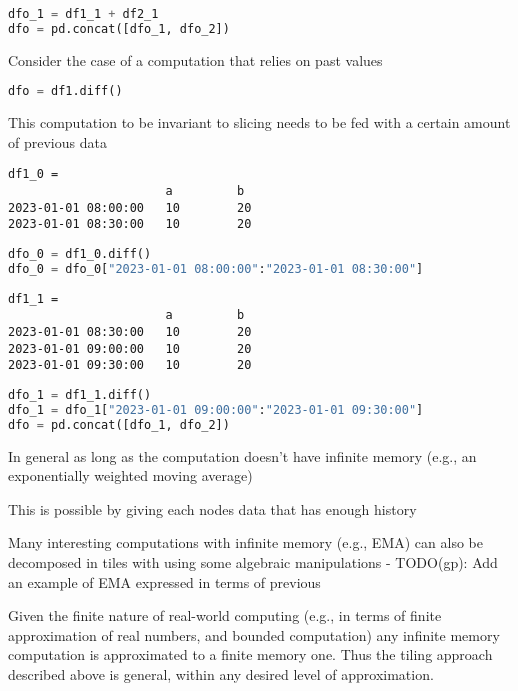 \documentclass[11pt, reqno]{amsart}
\theoremstyle{definition}
\theoremstyle{remark}
\begin{document}
  \begin{lstlisting}[language=Python]
dfo_1 = df1_1 + df2_1
dfo = pd.concat([dfo_1, dfo_2])
\end{lstlisting}

  Consider the case of a computation that relies on past values

  \begin{lstlisting}[language=Python]
dfo = df1.diff()
\end{lstlisting}

  This computation to be invariant to slicing needs to be fed with a certain amount
  of previous data

  \begin{verbatim}
df1_0 =
                      a         b
2023-01-01 08:00:00   10        20
2023-01-01 08:30:00   10        20
\end{verbatim}

  \begin{lstlisting}[language=Python]
dfo_0 = df1_0.diff()
dfo_0 = dfo_0["2023-01-01 08:00:00":"2023-01-01 08:30:00"]
\end{lstlisting}

  \begin{verbatim}
df1_1 =
                      a         b
2023-01-01 08:30:00   10        20
2023-01-01 09:00:00   10        20
2023-01-01 09:30:00   10        20
\end{verbatim}

  \begin{lstlisting}[language=Python]
dfo_1 = df1_1.diff()
dfo_1 = dfo_1["2023-01-01 09:00:00":"2023-01-01 09:30:00"]
dfo = pd.concat([dfo_1, dfo_2])
\end{lstlisting}

  In general as long as the computation doesn't have infinite memory (e.g., an exponentially
  weighted moving average)

  This is possible by giving each nodes data that has enough history

  Many interesting computations with infinite memory (e.g., EMA) can also be
  decomposed in tiles with using some algebraic manipulations - TODO(gp): Add an
  example of EMA expressed in terms of previous

  Given the finite nature of real-world computing (e.g., in terms of finite
  approximation of real numbers, and bounded computation) any infinite memory
  computation is approximated to a finite memory one. Thus the tiling approach described
  above is general, within any desired level of approximation.
\end{document}
